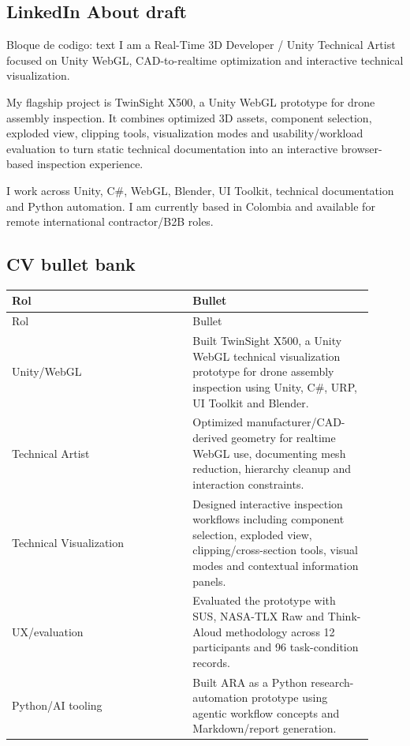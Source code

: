 \subsection{LinkedIn About draft}


\begin{mdcode}
Bloque de codigo: text
I am a Real-Time 3D Developer / Unity Technical Artist focused on Unity WebGL, CAD-to-realtime optimization and interactive technical visualization.

My flagship project is TwinSight X500, a Unity WebGL prototype for drone assembly inspection. It combines optimized 3D assets, component selection, exploded view, clipping tools, visualization modes and usability/workload evaluation to turn static technical documentation into an interactive browser-based inspection experience.

I work across Unity, C#, WebGL, Blender, UI Toolkit, technical documentation and Python automation. I am currently based in Colombia and available for remote international contractor/B2B roles.
\end{mdcode}


\subsection{CV bullet bank}


\begin{center}
\scriptsize
\begin{longtable}{>{\raggedright\arraybackslash}p{0.455\linewidth} >{\raggedright\arraybackslash}p{0.455\linewidth}}
\toprule
Rol & Bullet \\
\midrule
\endfirsthead
\toprule
Rol & Bullet \\
\midrule
\endhead
Unity/WebGL & Built TwinSight X500, a Unity WebGL technical visualization prototype for drone assembly inspection using Unity, C\#, URP, UI Toolkit and Blender. \\
Technical Artist & Optimized manufacturer/CAD-derived geometry for realtime WebGL use, documenting mesh reduction, hierarchy cleanup and interaction constraints. \\
Technical Visualization & Designed interactive inspection workflows including component selection, exploded view, clipping/cross-section tools, visual modes and contextual information panels. \\
UX/evaluation & Evaluated the prototype with SUS, NASA-TLX Raw and Think-Aloud methodology across 12 participants and 96 task-condition records. \\
Python/AI tooling & Built ARA as a Python research-automation prototype using agentic workflow concepts and Markdown/report generation. \\
\bottomrule
\end{longtable}
\end{center}


